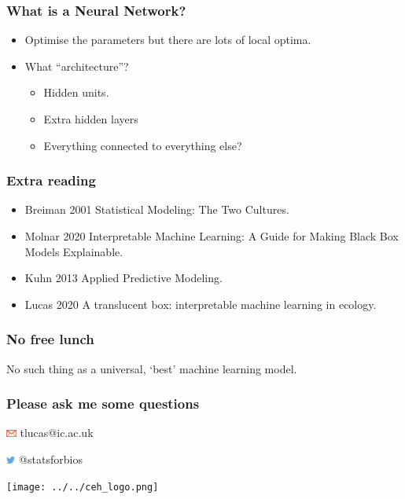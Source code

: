 \documentclass[handout, aspectratio = 169]{beamer}
\begin{document}
\begin{frame}
\frametitle{What is a Neural Network?}

\begin{itemize}
\item Optimise the parameters but there are lots of local optima.
\item What ``architecture''?
	\begin{itemize}
	\item Hidden units.
	\item Extra hidden layers
	\item Everything connected to everything else?
	\end{itemize}
\end{itemize}
\end{frame} 




\begin{frame}
\frametitle{Extra reading}

\begin{itemize}
\item Breiman 2001 Statistical Modeling: The Two Cultures.
\item Molnar 2020 Interpretable Machine Learning: A Guide for Making Black Box Models Explainable.
\item Kuhn 2013 Applied Predictive Modeling.
\item Lucas 2020 A translucent box: interpretable machine learning in ecology.
\end{itemize}
\end{frame} 



\begin{frame}
\frametitle{No free lunch}
No such thing as a universal, `best' machine learning model.
\end{frame} 




\begin{frame}

\frametitle{Please ask me some questions}

\vspace{5mm}


\vspace{4mm}

\includegraphics[height=7pt]{Ar_Icon_Contact.pdf} tlucas{\footnotesize{@}}ic.ac.uk

\includegraphics[height=7pt]{Twitter_logo_blue-small.png} {\footnotesize{@}}statsforbios

\vspace{2cm}
\hfill %
\texttt{[image: ../../ceh\_logo.png]}

\end{frame}




 
\end{document}
